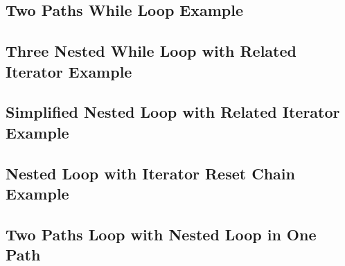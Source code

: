 \subsection{Two Paths While Loop Example}

\subsection{Three Nested While Loop with Related Iterator Example}

\subsection{Simplified Nested Loop with Related Iterator Example}

\subsection{Nested Loop with Iterator Reset Chain Example}

\subsection{Two Paths Loop with Nested Loop in One Path}

